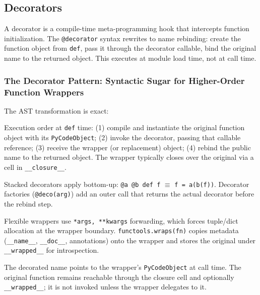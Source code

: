 \subsection{Decorators}

A decorator is a compile-time meta-programming hook that intercepts function initialization. The \texttt{@decorator} syntax rewrites to name rebinding: create the function object from \texttt{def}, pass it through the decorator callable, bind the original name to the returned object. This executes at module load time, not at call time.

\subsubsection{The Decorator Pattern: Syntactic Sugar for Higher-Order Function Wrappers}



The AST transformation is exact:

Execution order at \texttt{def} time: (1) compile and instantiate the original function object with its \texttt{PyCodeObject}; (2) invoke the decorator, passing that callable reference; (3) receive the wrapper (or replacement) object; (4) rebind the public name to the returned object. The wrapper typically closes over the original via a cell in \texttt{\_\_closure\_\_}.

Stacked decorators apply bottom-up: \texttt{@a @b def f} $\equiv$ \texttt{f = a(b(f))}. Decorator factories (\texttt{@deco(arg)}) add an outer call that returns the actual decorator before the rebind step.

Flexible wrappers use \texttt{*args, **kwargs} forwarding, which forces tuple/dict allocation at the wrapper boundary. \texttt{functools.wraps(fn)} copies metadata (\texttt{\_\_name\_\_}, \texttt{\_\_doc\_\_}, annotations) onto the wrapper and stores the original under \texttt{\_\_wrapped\_\_} for introspection.

The decorated name points to the wrapper's \texttt{PyCodeObject} at call time. The original function remains reachable through the closure cell and optionally \texttt{\_\_wrapped\_\_}; it is not invoked unless the wrapper delegates to it.
